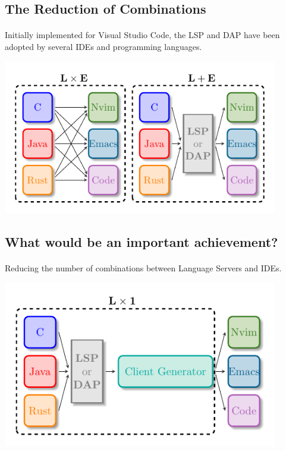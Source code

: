 \documentclass[9pt,xcolor=table,svgnames]{beamer}
\begin{document}
\subsection[The Reductions of Combinations]{The Reduction of Combinations}
\begin{frame}{\secname}
    \framesubtitle{\subsecname}

    Initially implemented for Visual Studio Code, the LSP and DAP have been adopted by several \alert{IDEs} and \alert{programming languages}.

    \pause
    \begin{center}
    \includegraphics[width=0.9\textwidth]{figs/lsp-combination.pdf}
    \end{center}
\end{frame}

\subsection[An Achievement]{What would be an important achievement?}
\begin{frame}{\secname}
    \framesubtitle{\subsecname}

    Reducing the number of combinations between \alert{Language Servers} and \alert{IDEs}.

    \pause

    \begin{center}
    \includegraphics[width=0.9\textwidth]{figs/lsp-combination-lx1.pdf}
    \end{center}


    \noindent{}%

\end{frame}
\end{document}
